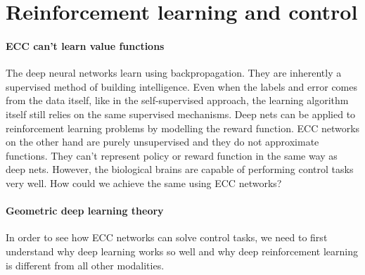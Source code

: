 \documentclass[12pt]{article}
\begin{document}
\section{Reinforcement learning and control}

\paragraph{ECC can't learn value functions}

The deep neural networks learn using backpropagation. They are inherently a supervised method of building intelligence. Even when the labels and error comes from the data itself, like in the self-supervised approach, the learning algorithm itself still relies on the same supervised mechanisms. Deep nets can be applied to reinforcement learning problems by modelling the reward function. ECC networks on the other hand are purely unsupervised and they do not approximate functions. They can't represent policy or reward function in the same way as deep nets. However, the biological brains are capable of performing control tasks very well. How could we achieve the same using ECC networks?

\paragraph{Geometric deep learning theory}

In order to see how ECC networks can solve control tasks, we need to first understand why deep learning works so well and why deep reinforcement learning is different from all other modalities. 
\end{document}

